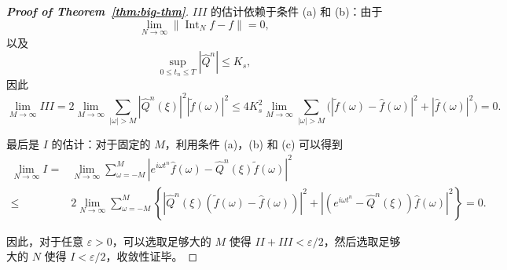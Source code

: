 \begin{proof}[\normalfont\bfseries Proof of Theorem~\ref{thm:big-thm}]
    $I\!I\!I$ 的估计依赖于条件 (a) 和 (b)：由于
    \[
        \lim_{N \to \infty} \| \operatorname{Int}_N f  - f \| = 0,
    \]
    以及
    \[
        \sup_{0 \le t_n \le T} |\widehat{Q}^n| \le K_s,
    \]
    因此
    \[
        \lim_{M \to \infty} I\!I\!I
        = 2 \lim_{M \to \infty} \sum_{|\omega| > M} |\widehat{Q}^n(\xi)|^2 |\tilde{f}(\omega)|^2
        \le
        4 K_s^2  \lim_{M \to \infty} \sum_{|\omega| > M}
        \Big(|\tilde{f}(\omega) - \hat{f}(\omega)|^2 + |\hat{f}(\omega)|^2 \Big) = 0.
    \]

    最后是 $I$ 的估计：对于固定的 $M$，利用条件 (a)，(b) 和 (c) 可以得到
    \begin{align*}
        \lim_{N \to \infty} I ={} & \lim_{N \to \infty} \sum_{\omega = -M}^{M} \left| e^{i \omega t^n} \hat{f}(\omega ) - \widehat{Q}^n(\xi) \tilde{f}(\omega ) \right|^2 \\
        \le{}                     & 2 \lim_{N \to \infty} \sum_{\omega = -M}^{M}
        \left\{
        \left| \widehat{Q}^n(\xi) \left(\tilde{f}(\omega) - \hat{f}(\omega) \right) \right|^2
        + \left| \left(e^{i \omega t^n}  - \widehat{Q}^n(\xi)\right) \hat{f}(\omega ) \right|^2
        \right\} = 0.
    \end{align*}

    因此，对于任意 $\varepsilon > 0$，可以选取足够大的 $M$ 使得 $I\!I + I\!I\!I < \varepsilon/2$，然后选取足够大的 $N$ 使得 $I < \varepsilon/2$，收敛性证毕。
\end{proof}
